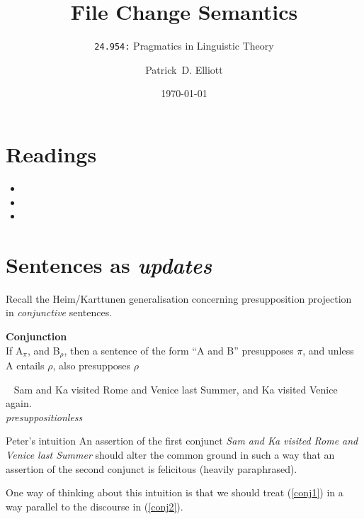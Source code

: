 \documentclass[cronos,landscape,paper=letter]{ling-handout}
\title{File Change Semantics}
\subtitle{\texttt{24.954:} Pragmatics in Linguistic Theory}
\date{\today}
\author{Patrick~D. Elliott}
\begin{document}
\maketitle

\section*{Readings}


\begin{itemize}

    \item {}

    \item {}

    \item {}

\end{itemize}

\section{Sentences as \textit{updates}}

Recall the Heim/Karttunen generalisation concerning presupposition projection in \textit{conjunctive} sentences.

\ex
\textbf{Conjunction}\\If A\(_π\), and B\(_ρ\), then a sentence of the form \enquote{A and B} presupposes \(π\), and unless A entails \(ρ\), also presupposes \(ρ\)
\xe

\ex~\label{conj1}
Sam and Ka visited Rome and Venice last Summer, and Ka visited Venice again.\\
\textit{presuppositionless}
\xe

\begin{tcolorbox}
  Peter's intuition
  \tcblower
  An assertion of the first conjunct \textit{Sam and Ka visited Rome and Venice last Summer} should alter the common ground in such a way that an assertion of the second conjunct is felicitous (heavily paraphrased).
\end{tcolorbox}

One way of thinking about this intuition is that we should treat (\ref{conj1}) in a way parallel to the discourse in (\ref{conj2}).
\end{document}
